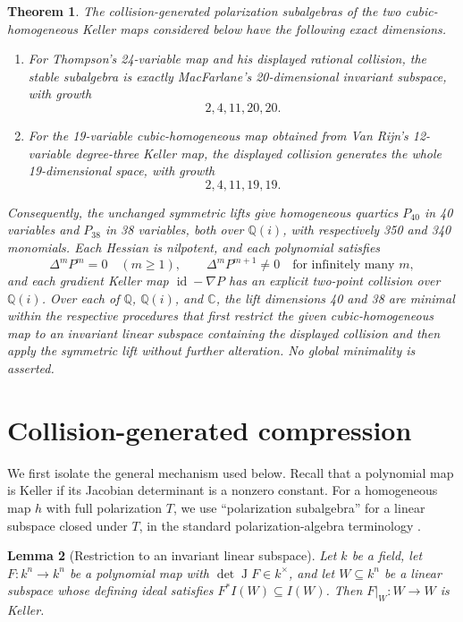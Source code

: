 \documentclass[11pt]{article}
\newtheorem{theorem}{Theorem}
\newtheorem{lemma}[theorem]{Lemma}
\theoremstyle{remark}
\DeclareMathOperator{\J}{J}
\newcommand{\Q}{\mathbb{Q}}
\newcommand{\C}{\mathbb{C}}
\newcommand{\id}{\operatorname{id}}
\begin{document}
\begin{theorem}\label{thm:main}
The collision-generated polarization subalgebras of the two cubic-homogeneous Keller maps considered below have the following exact dimensions.
\begin{enumerate}[label=\arabic*.]
\item For Thompson's 24-variable map and his displayed rational collision, the stable subalgebra is exactly MacFarlane's 20-dimensional invariant subspace, with growth
\[
2,4,11,20,20.
\]
\item For the 19-variable cubic-homogeneous map obtained from Van Rijn's 12-variable degree-three Keller map, the displayed collision generates the whole 19-dimensional space, with growth
\[
2,4,11,19,19.
\]
\end{enumerate}
Consequently, the unchanged symmetric lifts give homogeneous quartics $P_{40}$ in 40 variables and $P_{38}$ in 38 variables, both over $\Q(i)$, with respectively 350 and 340 monomials. Each Hessian is nilpotent, and each polynomial satisfies
\[
\Delta^mP^m=0\quad(m\ge1),\qquad
\Delta^mP^{m+1}\ne0\quad\text{for infinitely many }m,
\]
and each gradient Keller map $\id-\nabla P$ has an explicit two-point collision over $\Q(i)$. Over each of $\Q$, $\Q(i)$, and $\C$, the lift dimensions 40 and 38 are minimal within the respective procedures that first restrict the given cubic-homogeneous map to an invariant linear subspace containing the displayed collision and then apply the symmetric lift without further alteration. No global minimality is asserted.
\end{theorem}

\section{Collision-generated compression}\label{sec:compression}

We first isolate the general mechanism used below. Recall that a polynomial map is Keller if its Jacobian determinant is a nonzero constant. For a homogeneous map $h$ with full polarization $T$, we use ``polarization subalgebra'' for a linear subspace closed under $T$, in the standard polarization-algebra terminology \citep{Umirbaev2019}.

\begin{lemma}[Restriction to an invariant linear subspace]\label{lem:restriction}
Let $k$ be a field, let $F\colon k^n\to k^n$ be a polynomial map with $\det\J F\in k^\times$, and let $W\subseteq k^n$ be a linear subspace whose defining ideal satisfies $F^*I(W)\subseteq I(W)$. Then $F|_W\colon W\to W$ is Keller.
\end{lemma}
\end{document}
